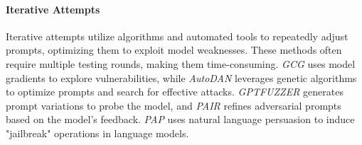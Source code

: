 
\paragraph{Iterative Attempts} Iterative attempts utilize algorithms and automated tools to repeatedly adjust prompts, optimizing them to exploit model weaknesses. These methods often require multiple testing rounds, making them time-consuming. \textit{GCG} \cite{zou2023universal} uses model gradients to explore vulnerabilities, while \textit{AutoDAN} \cite{liu2024autodan} leverages genetic algorithms to optimize prompts and search for effective attacks. \textit{GPTFUZZER} \cite{yu2023gptfuzzer} generates prompt variations to probe the model, and \textit{PAIR} \cite{pair_chao2024jailbreaking} refines adversarial prompts based on the model’s feedback. \textit{PAP} \cite{pap_zeng-etal-2024-johnny} uses natural language persuasion to induce "jailbreak" operations in language models.

